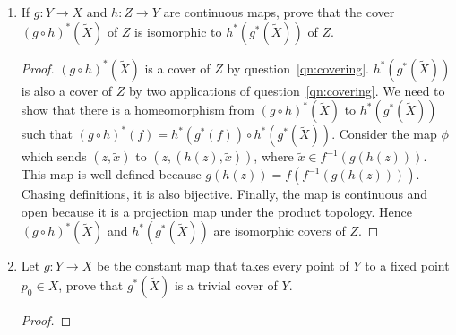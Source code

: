 \documentclass{article}
\begin{document}
\begin{enumerate}
\begin{enumerate}
\begin{proof}
          $\phi$ is bijective from the way it was defined. Also, it is a
          projection map under the product topology, which makes it open
          and continuous. Therefore $\phi$ is a homeomorphism, which
          completes the proof.
        \end{proof}

      \item If $g:Y\rightarrow X$ and $h:Z\rightarrow Y$ are continuous
        maps, prove that the cover $(g\circ h)^*(\tilde{X})$ of $Z$ is
        isomorphic to $h^*(g^*(\tilde{X}))$ of $Z$.

        \begin{proof}
          $(g\circ h)^*(\tilde{X})$ is a cover of $Z$ by
          question~\ref{qn:covering}. $h^*(g^*(\tilde{X}))$ is also a cover
          of $Z$ by two applications of question~\ref{qn:covering}.  We
          need to show that there is a homeomorphism from $(g\circ
          h)^*(\tilde{X})$ to $h^*(g^*(\tilde{X}))$ such that $(g\circ
          h)^*(f)=h^*(g^*(f))\circ h^*(g^*(\tilde{X}))$. Consider the map
          $\phi$ which sends $(z,\tilde{x})$ to $(z,(h(z),\tilde{x}))$,
          where $\tilde{x}\in f^{-1}(g(h(z)))$. This map is well-defined
          because $g(h(z))=f(f^{-1}(g(h(z))))$. Chasing definitions, it is
          also bijective. Finally, the map is continuous and open because
          it is a projection map under the product topology. Hence $(g\circ
          h)^*(\tilde{X})$ and $h^*(g^*(\tilde{X}))$ are isomorphic covers
          of $Z$.
        \end{proof}

      \item Let $g:Y\rightarrow X$ be the constant map that takes every
        point of $Y$ to a fixed point $p_0\in X$, prove that
        $g^*(\tilde{X})$ is a trivial cover of $Y$. 
        \begin{proof}
        \end{proof}
    \end{enumerate}
\end{enumerate}
\end{document}
